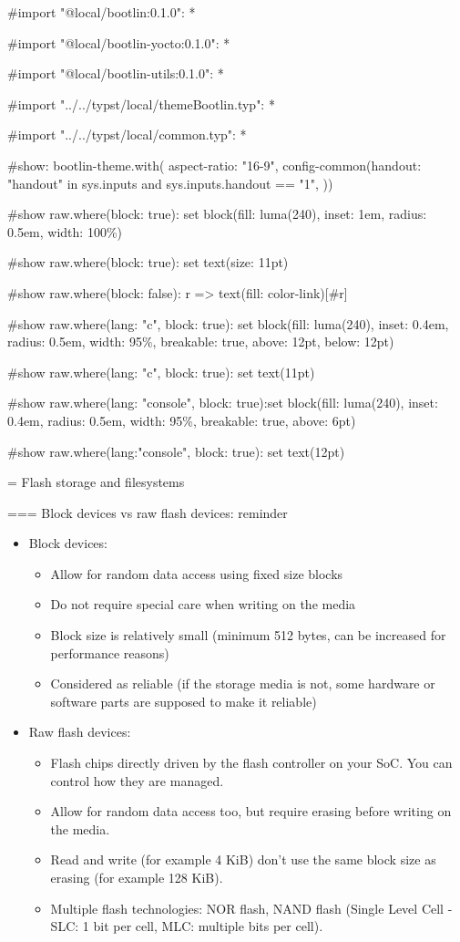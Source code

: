 #import "@local/bootlin:0.1.0": *

#import "@local/bootlin-yocto:0.1.0": *

#import "@local/bootlin-utils:0.1.0": *

#import "../../typst/local/themeBootlin.typ": *

#import "../../typst/local/common.typ": *

#show: bootlin-theme.with( aspect-ratio: "16-9", config-common(handout: "handout" in sys.inputs and sys.inputs.handout == "1", ))

#show raw.where(block: true): set block(fill: luma(240), inset: 1em, radius: 0.5em, width: 100\%)

#show raw.where(block: true): set text(size: 11pt)

#show raw.where(block: false): r => text(fill: color-link)[#r]

#show raw.where(lang: "c", block: true): set block(fill: luma(240), inset: 0.4em, radius: 0.5em, width: 95\%, breakable: true, above: 12pt, below: 12pt)

#show raw.where(lang: "c", block: true): set text(11pt)

#show raw.where(lang: "console", block: true):set block(fill: luma(240), inset: 0.4em, radius: 0.5em, width: 95\%, breakable: true, above: 6pt)

#show raw.where(lang:"console", block: true): set text(12pt)

 = Flash storage and filesystems

=== Block devices vs raw flash devices: reminder
  \begin{itemize}
  \item Block devices:
    \begin{itemize}
    \item Allow for random data access using fixed size blocks
    \item Do not require special care when writing on the media
    \item Block size is relatively small (minimum 512 bytes, can be
      increased for performance reasons)
    \item Considered as reliable (if the storage media is not, some
      hardware or software parts are supposed to make it reliable)
    \end{itemize}
  \item Raw flash devices:
    \begin{itemize}
    \item Flash chips directly driven by the flash controller on your SoC.
          You can control how they are managed.
    \item Allow for random data access too, but require erasing before
          writing on the media.
    \item Read and write (for example 4 KiB) don't use
          the same block size as erasing (for example 128 KiB).
    \item Multiple flash technologies: NOR flash, NAND
          flash (Single Level Cell - SLC: 1 bit per cell, MLC: multiple bits per cell).
    \end{itemize}
  \end{itemize}


